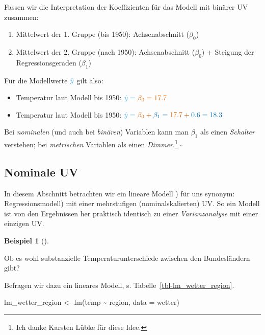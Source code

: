 \documentclass[
  letterpaper,
  oneside,
  open=any]{scrbook}
\newenvironment{Shaded}{\begin{snugshade}}{\end{snugshade}}
\newcommand{\AttributeTok}[1]{\textcolor[rgb]{0.40,0.45,0.13}{#1}}
\newcommand{\FunctionTok}[1]{\textcolor[rgb]{0.28,0.35,0.67}{#1}}
\newcommand{\NormalTok}[1]{\textcolor[rgb]{0.00,0.23,0.31}{#1}}
\newcommand{\OtherTok}[1]{\textcolor[rgb]{0.00,0.23,0.31}{#1}}
\newcommand{\SpecialCharTok}[1]{\textcolor[rgb]{0.37,0.37,0.37}{#1}}
\providecommand{\tightlist}{%
  \setlength{\itemsep}{0pt}\setlength{\parskip}{0pt}}\usepackage{longtable,booktabs,array}
\theoremstyle{definition}
\theoremstyle{definition}
\newtheorem{example}{Beispiel}[chapter]
\theoremstyle{definition}
\theoremstyle{remark}
\begin{document}
Fassen wir die Interpretation der Koeffizienten für das Modell mit
binärer UV zusammen:

\begin{enumerate}
\def\labelenumi{\arabic{enumi}.}
\tightlist
\item
  Mittelwert der 1. Gruppe (bis 1950): {Achsenabschnitt (\(\beta_0\))}
\item
  Mittelwert der 2. Gruppe (nach 1950): {Achsenabschnitt (\(\beta_0\))}
  + {Steigung der Regressionsgeraden (\(\beta_1\))}
\end{enumerate}

Für die Modellwerte \(\color{modelcol}{\hat{y}}\) gilt also:

\begin{itemize}
\item
  Temperatur laut Modell bis 1950:
  \(\color{modelcol}{\hat{y}} = \color{beta0col}{\beta_0} = 17.7\)
\item
  Temperatur laut Modell bis 1950:
  \(\color{modelcol}{\hat{y}} = \color{beta0col}{\beta_0} +  \color{beta1col}{\beta_1}= \color{beta0col}{17.7} + \color{beta1col}{0.6} = 18.3\)
\end{itemize}

Bei \emph{nominalen} (und auch bei \emph{binären}) Variablen kann man
\({\beta_1}\) als einen \emph{Schalter} verstehen; bei \emph{metrischen}
Variablen als einen \emph{Dimmer}.\footnote{Ich danke Karsten Lübke für
  diese Idee.} \(\square\)

\subsection{Nominale UV}\label{nominale-uv}

In diesem Abschnitt betrachten wir ein lineare Modell ) für uns synonym:
Regressionsmodell) mit einer mehrstufigen (nominalskalierten) UV. So ein
Modell ist von den Ergebnissen her praktisch identisch zu einer
\emph{Varianzanalyse} mit einer einzigen UV.

\begin{example}[]\protect\hypertarget{exm-wetter2}{}\label{exm-wetter2}

Ob es wohl substanzielle Temperaturunterschiede zwischen den
Bundesländern gibt?

\end{example}

Befragen wir dazu ein lineares Modell, s.
Tabelle~\ref{tbl-lm_wetter_region}.

\begin{Shaded}
\begin{Highlighting}[]
\NormalTok{lm\_wetter\_region }\OtherTok{\textless{}{-}} \FunctionTok{lm}\NormalTok{(temp }\SpecialCharTok{\textasciitilde{}}\NormalTok{ region, }\AttributeTok{data =}\NormalTok{ wetter)}
\end{Highlighting}
\end{Shaded}
\end{document}
